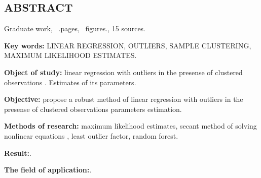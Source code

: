 \newpage

\begin{center}
    \section*{ABSTRACT}
\end{center}

Graduate work, ~.pages, ~figures., 15 sources.

\textbf{Key words:} LINEAR REGRESSION, OUTLIERS, SAMPLE CLUSTERING, MAXIMUM LIKELIHOOD ESTIMATES.

\textbf{Object of study:} linear regression with outliers in the presense of clustered observations . Estimates of its parameters.

\textbf{Objective:} propose a robust method of linear regression with outliers in the presense of clustered observations parameters estimation.

\textbf{Methods of research:} maximum likelihood estimates, secant method of solving nonlinear equations , least outlier factor, random forest.

\textbf{Result:}.

\textbf{The field of application:}.